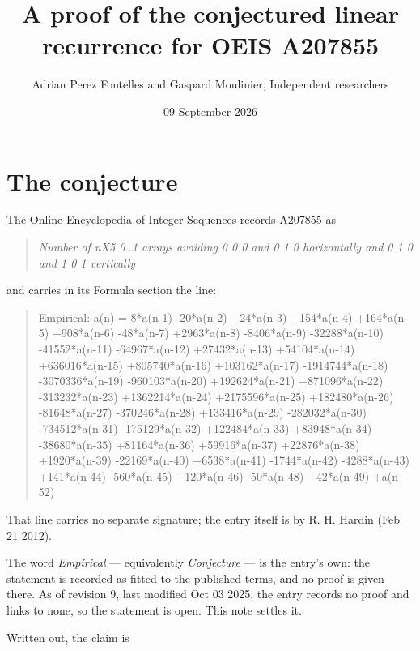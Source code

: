 \documentclass[11pt]{article}
\title{A proof of the conjectured linear recurrence for OEIS A207855}
\author{Adrian Perez Fontelles and Gaspard Moulinier, Independent researchers}
\date{09 September 2026}
\theoremstyle{definition}
\begin{document}
\maketitle
\section{The conjecture}

The Online Encyclopedia of Integer Sequences records \href{https://oeis.org/A207855}{A207855} as

\begin{quote}\itshape Number of nX5 0..1 arrays avoiding 0 0 0 and 0 1 0 horizontally and 0 1 0 and 1 0 1 vertically\end{quote}

and carries in its Formula section the line:

\begin{quote}\ttfamily Empirical: a(n) = 8*a(n-1) -20*a(n-2) +24*a(n-3) +154*a(n-4) +164*a(n-5) +908*a(n-6) -48*a(n-7) +2963*a(n-8) -8406*a(n-9) -32288*a(n-10) -41552*a(n-11) -64967*a(n-12) +27432*a(n-13) +54104*a(n-14) +636016*a(n-15) +805740*a(n-16) +103162*a(n-17) -1914744*a(n-18) -3070336*a(n-19) -960103*a(n-20) +192624*a(n-21) +871096*a(n-22) -313232*a(n-23) +1362214*a(n-24) +2175596*a(n-25) +182480*a(n-26) -81648*a(n-27) -370246*a(n-28) +133416*a(n-29) -282032*a(n-30) -734512*a(n-31) -175129*a(n-32) +122484*a(n-33) +83948*a(n-34) -38680*a(n-35) +81164*a(n-36) +59916*a(n-37) +22876*a(n-38) +1920*a(n-39) -22169*a(n-40) +6538*a(n-41) -1744*a(n-42) -4288*a(n-43) +141*a(n-44) -560*a(n-45) +120*a(n-46) -50*a(n-48) +42*a(n-49) +a(n-52)\end{quote}

That line carries no separate signature; the entry itself is by R. H. Hardin (Feb 21 2012).

The word {\itshape Empirical} --- equivalently {\itshape Conjecture} --- is the entry's own: the statement is recorded as fitted to the published terms, and no proof is given there. As of revision 9, last modified Oct 03 2025, the entry records no proof and links to none, so the statement is open. This note settles it.

Written out, the claim is
\end{document}
